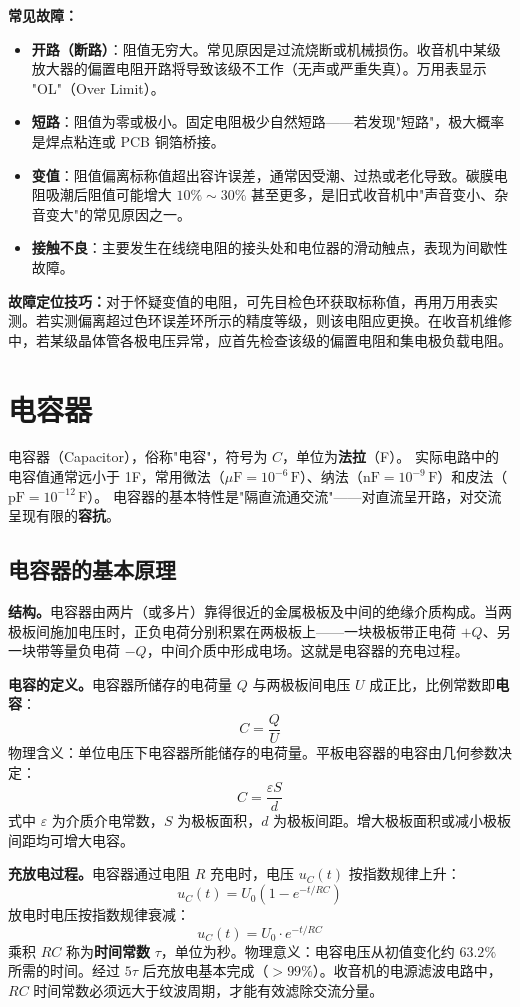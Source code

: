 \documentclass[12pt,UTF8]{ctexbook}
\begin{document}
\textbf{常见故障：}
\begin{itemize}
  \item \textbf{开路（断路）}：阻值无穷大。常见原因是过流烧断或机械损伤。收音机中某级放大器的偏置电阻开路将导致该级不工作（无声或严重失真）。万用表显示 "OL"（Over Limit）。
  \item \textbf{短路}：阻值为零或极小。固定电阻极少自然短路——若发现"短路"，极大概率是焊点粘连或 PCB 铜箔桥接。
  \item \textbf{变值}：阻值偏离标称值超出容许误差，通常因受潮、过热或老化导致。碳膜电阻吸潮后阻值可能增大 $10\%\sim30\%$ 甚至更多，是旧式收音机中"声音变小、杂音变大"的常见原因之一。
  \item \textbf{接触不良}：主要发生在线绕电阻的接头处和电位器的滑动触点，表现为间歇性故障。
\end{itemize}
\textbf{故障定位技巧：}对于怀疑变值的电阻，可先目检色环获取标称值，再用万用表实测。若实测偏离超过色环误差环所示的精度等级，则该电阻应更换。在收音机维修中，若某级晶体管各极电压异常，应首先检查该级的偏置电阻和集电极负载电阻。

\section{电容器}
\label{sec:capacitor}

电容器（Capacitor），俗称"电容"，符号为 $C$，单位为\textbf{法拉}（F）。
实际电路中的电容值通常远小于 1F，常用微法（$\mu\mathrm{F}=10^{-6}\,\mathrm{F}$）、纳法（$\mathrm{nF}=10^{-9}\,\mathrm{F}$）和皮法（$\mathrm{pF}=10^{-12}\,\mathrm{F}$）。
电容器的基本特性是"隔直流通交流"——对直流呈开路，对交流呈现有限的\textbf{容抗}。

\subsection{电容器的基本原理}

\textbf{结构。}电容器由两片（或多片）靠得很近的金属极板及中间的绝缘介质构成。当两极板间施加电压时，正负电荷分别积累在两极板上——一块极板带正电荷 $+Q$、另一块带等量负电荷 $-Q$，中间介质中形成电场。这就是电容器的充电过程。

\textbf{电容的定义。}电容器所储存的电荷量 $Q$ 与两极板间电压 $U$ 成正比，比例常数即\textbf{电容}：
\[
\boxed{C = \frac{Q}{U}}
\]
物理含义：单位电压下电容器所能储存的电荷量。平板电容器的电容由几何参数决定：
\[
C = \frac{\varepsilon S}{d}
\]
式中 $\varepsilon$ 为介质介电常数，$S$ 为极板面积，$d$ 为极板间距。增大极板面积或减小极板间距均可增大电容。

\textbf{充放电过程。}电容器通过电阻 $R$ 充电时，电压 $u_C(t)$ 按指数规律上升：
\[
u_C(t) = U_0(1 - e^{-t/RC})
\]
放电时电压按指数规律衰减：
\[
u_C(t) = U_0 \cdot e^{-t/RC}
\]
乘积 $RC$ 称为\textbf{时间常数} $\tau$，单位为秒。物理意义：电容电压从初值变化约 $63.2\%$ 所需的时间。经过 $5\tau$ 后充放电基本完成（$>99\%$）。收音机的电源滤波电路中，$RC$ 时间常数必须远大于纹波周期，才能有效滤除交流分量。
\end{document}
